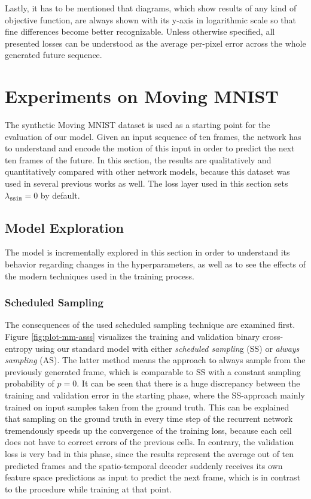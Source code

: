 Lastly, it has to be mentioned that diagrams, which show results of any kind of objective function, are always shown with its y-axis in logarithmic scale so that fine differences become better recognizable. Unless otherwise specified, all presented losses can be understood as the average per-pixel error across the whole generated future sequence.

\section{Experiments on Moving MNIST} \label{sec:exp-mm}

The synthetic Moving MNIST dataset is used as a starting point for the evaluation of our model. Given an input sequence of ten frames, the network has to understand and encode the motion of this input in order to predict the next ten frames of the future. In this section, the results are qualitatively and quantitatively compared with other network models, because this dataset was used in several previous works as well. The loss layer used in this section sets $ \lambda_{\texttt{ssim}} = 0 $ by default.

\subsection{Model Exploration}

The model is incrementally explored in this section in order to understand its behavior regarding changes in the hyperparameters, as well as to see the effects of the modern techniques used in the training process.

\subsubsection*{Scheduled Sampling}

The consequences of the used scheduled sampling technique are examined first. Figure \ref{fig:plot-mm-asss} visualizes the training and validation binary cross-entropy using our standard model with either \textit{scheduled samplin}g (SS) or \textit{always sampling} (AS). The latter method means the approach to always sample from the previously generated frame, which is comparable to SS with a constant sampling probability of $p=0$. It can be seen that there is a huge discrepancy between the training and validation error in the starting phase, where the SS-approach mainly trained on input samples taken from the ground truth. This can be explained that sampling on the ground truth in every time step of the recurrent network tremendously speeds up the convergence of the training loss, because each cell does not have to correct errors of the previous cells. In contrary, the validation loss is very bad in this phase, since the results represent the average out of ten predicted frames and the spatio-temporal decoder suddenly receives its own feature space predictions as input to predict the next frame, which is in contrast to the procedure while training at that point.

